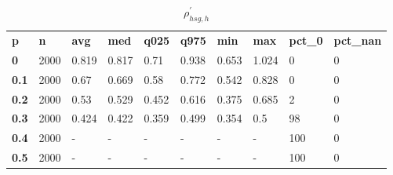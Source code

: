 \begin{table}[h]
 \centering 
\footnotesize
\caption{$\rho_{hsg,h}^\prime $}
\label{tab:alphahsgh}
\begin{tabular}[h]{| l l l l l l l l l l|
    } \hline
\textbf{ p} & \textbf{ n} & \textbf{ avg} & \textbf{ med} & \textbf{ q025} & \textbf{ q975} & \textbf{ min} & \textbf{ max} & \textbf{ pct\_0} & \textbf{ pct\_nan}
           \\
  \textbf{  0} & 2000 & 0.819 & 0.817 &  0.71 & 0.938 & 0.653 & 1.024 &   0 & 0
           \\
  \textbf{0.1} & 2000 &  0.67 & 0.669 &  0.58 & 0.772 & 0.542 & 0.828 &   0 & 0
           \\
  \textbf{0.2} & 2000 &  0.53 & 0.529 & 0.452 & 0.616 & 0.375 & 0.685 &   2 & 0
           \\
  \textbf{0.3} & 2000 & 0.424 & 0.422 & 0.359 & 0.499 & 0.354 &   0.5 &  98 & 0
           \\
  \textbf{0.4} & 2000 & - & - & - & - & - & - & 100 & 0
           \\
  \textbf{0.5} & 2000 & - & - & - & - & - & - & 100 & 0
           \\
 \hline \end{tabular}
 \end{table}
